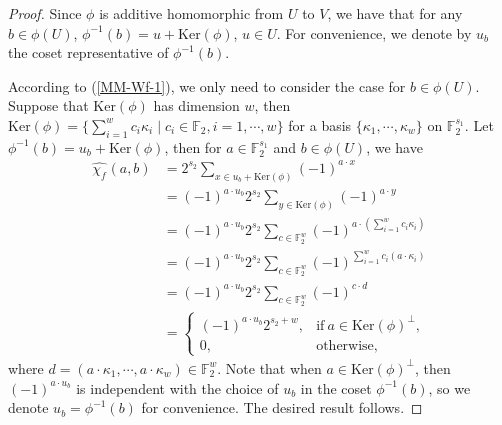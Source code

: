 \documentclass[10pt]{article}
\newcommand{\F}{\mathbb{F}}
\newcommand{\0}{\textbf{0}}
\newcommand{\1}{\textbf{1}}
\newcommand{\W}[2][]{\widehat{\chi_{#2}}^{#1}}
\begin{document}
\begin{proof}
    Since $\phi$ is additive homomorphic from $U$ to $V$, we have that for any $b\in \phi(U)$,  $\phi^{-1}(b)=u+\mathrm{Ker}(\phi)$, $u\in U$.
    For convenience, we denote by $u_b$ the coset representative of $\phi^{-1}(b)$.

    According to (\ref{MM-Wf-1}), we only need to consider the case for $b\in\phi(U)$.
    Suppose that $\mathrm{Ker}(\phi)$ has dimension $w$,
    then $\mathrm{Ker}(\phi)=\{\sum_{i=1}^w c_i \kappa_i\mid c_i\in \F_2, i=1,\cdots, w\}$ for a basis $\{\kappa_1,\cdots, \kappa_w\}$ on $\F_2^{s_1}$.
    Let $\phi^{-1}(b)=u_b+\mathrm{Ker}(\phi)$, then for $a\in\F_2^{s_1}$ and $b\in\phi(U)$, we have
    \begin{align*}
       \W f(a,b)&=2^{s_2} \sum\limits_{x\in u_b+\mathrm{Ker}(\phi)}(-1)^{a\cdot x}\\
                        &=(-1)^{a\cdot u_b} 2^{s_2} \sum\limits_{y\in \mathrm{Ker}(\phi)}(-1)^{a\cdot y}\\
                        &=(-1)^{a\cdot u_b} 2^{s_2} \sum\limits_{c\in \F_2^w}(-1)^{a\cdot (\sum_{i=1}^w c_i \kappa_i)}\\
                        &=(-1)^{a\cdot u_b} 2^{s_2} \sum\limits_{c\in \F_2^w}(-1)^{\sum_{i=1}^w c_i \left(a\cdot \kappa_i\right)}\\
                        &=(-1)^{a\cdot u_b} 2^{s_2} \sum\limits_{c\in \F_2^w}(-1)^{c \cdot d}\\
                        &=\left\{\begin{array}{ll}
                                 (-1)^{a\cdot u_b} 2^{s_2+w}, & \mbox{if}~a\in \mathrm{Ker}(\phi)^\bot,\\
                                 0, & \mbox{otherwise},
                                 \end{array}\right.
    \end{align*}
    where $d=(a \cdot \kappa_1,\cdots,a \cdot \kappa_w)\in \F_2^w$.
    Note that when $a\in \mathrm{Ker}(\phi)^\bot$,
    then $(-1)^{a\cdot u_b}$ is independent with the choice of $u_b$ in the coset $\phi^{-1}(b)$,
    so we denote $u_b=\phi^{-1}(b)$ for convenience.
    The desired result follows.
\end{proof}

\end{document}
